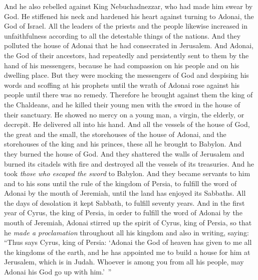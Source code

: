 \begin{biblechapter}
\verse And he also rebelled against King Nebuchadnezzar, who had made him swear by God. He stiffened his neck and hardened his heart against turning to Adonai, the God of Israel.
\verse All the leaders of the priests and the people likewise increased in unfaithfulness according to all the detestable things of the nations. And they polluted the house of Adonai that he had consecrated in Jerusalem.
\verse And Adonai, the God of their ancestors, had repeatedly and persistently sent to them by the hand of his messengers, because he had compassion on his people and on his dwelling place.
\verse But they were mocking the messengers of God and despising his words and scoffing at his prophets until the wrath of Adonai rose against his people until there was no remedy.
 Therefore he brought against them the king of the Chaldeans, and he killed their young men with the sword in the house of their sanctuary. He showed no mercy on a young man, a virgin, the elderly, or decrepit. He delivered all into his hand.
\verse And all the vessels of the house of God, the great and the small, the storehouses of the house of Adonai, and the storehouses of the king and his princes, these all he brought to Babylon.
\verse And they burned the house of God. And they shattered the walls of Jerusalem and burned its citadels with fire and destroyed all the vessels of its treasuries.
\verse And he took \textit{those who escaped the sword} to Babylon. And they became servants to him and to his sons until the rule of the kingdom of Persia,
\verse to fulfill the word of Adonai by the mouth of Jeremiah, until the land has enjoyed its Sabbaths. All the days of desolation it kept Sabbath, to fulfill seventy years.
 And in the first year of Cyrus, the king of Persia, in order to fulfill the word of Adonai by the mouth of Jeremiah, Adonai stirred up the spirit of Cyrus, king of Persia, so that he \textit{made a proclamation} throughout all his kingdom and also in writing, saying:
\verse “Thus says Cyrus, king of Persia: ‘Adonai the God of heaven has given to me all the kingdoms of the earth, and he has appointed me to build a house for him at Jerusalem, which is in Judah. Whoever is among you from all his people, may Adonai his God go up with him.’ ”
\end{biblechapter}

